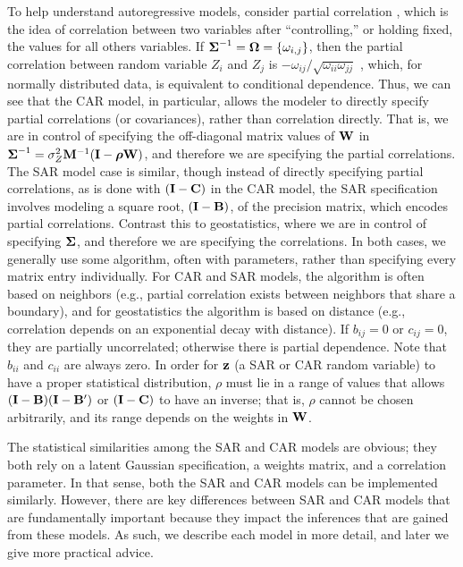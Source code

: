 \documentclass[11pt, titlepage]{article}\usepackage[]{graphicx}\usepackage[]{color}
\begin{document}
To help understand autoregressive models, consider partial correlation \citep[e.g.,][pg. 361]{Sned:Coch:stat:1980}, which is the idea of correlation between two variables after ``controlling,'' or holding fixed, the values for all others variables. If $\mbox{\boldmath $\Sigma$}^{-1} = \mbox{\boldmath $\Omega$} = \{\omega_{i,j}\}$, then the partial correlation between random variable $Z_i$ and $Z_j$ is $-\omega_{ij}/\sqrt{\omega_{ii}\omega_{jj}}$ \citep[pg. 120]{Laur:grap:1996}, which, for normally distributed data, is equivalent to conditional dependence. Thus, we can see that the CAR model, in particular, allows the modeler to directly specify partial correlations (or covariances), rather than correlation directly. That is, we are in control of specifying the off-diagonal matrix values of $\mathbf{W}$ in $\mbox{\boldmath $\Sigma$}^{-1} = \sigma^2_Z\mathbf{M}^{-1}(\mathbf{I}-\mbox{\boldmath $\rho$}\mathbf{W})$, and therefore we are specifying the partial correlations. The SAR model case is similar, though instead of directly specifying partial correlations, as is done with $(\mathbf{I} - \mathbf{C})$ in the CAR model, the SAR specification involves modeling a square root, $(\mathbf{I} - \mathbf{B})$, of the precision matrix, which encodes partial correlations. Contrast this to geostatistics, where we are in control of specifying $\mbox{\boldmath $\Sigma$}$, and therefore we are specifying the correlations.  In both cases, we generally use some algorithm, often with parameters, rather than specifying every matrix entry individually.  For CAR and SAR models, the algorithm is often based on neighbors (e.g., partial correlation exists between neighbors that share a boundary), and for geostatistics the algorithm is based on distance (e.g., correlation depends on an exponential decay with distance). If $b_{ij} = 0$ or $c_{ij} = 0$, they are partially uncorrelated; otherwise there is partial dependence. Note that $b_{ii}$ and $c_{ii}$ are always zero.  In order for $\mathbf{z}$ (a SAR or CAR random variable) to have a proper statistical distribution, $\rho$ must lie in a range of values that allows $(\mathbf{I}-\mathbf{B})(\mathbf{I}-\mathbf{B}^{\prime})$ or $(\mathbf{I} - \mathbf{C})$ to have an inverse; that is, $\rho$ cannot be chosen arbitrarily, and its range depends on the weights in $\mathbf{W}$.

The statistical similarities among the SAR and CAR models are obvious; they both rely on a latent Gaussian specification, a weights matrix, and a correlation parameter. In that sense, both the SAR and CAR models can be implemented similarly. However, there are key differences between SAR and CAR models that are fundamentally important because they impact the inferences that are gained from these models. As such, we describe each model in more detail, and later we give more practical advice.
\end{document}

